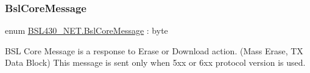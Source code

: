 \mbox{\label{namespace_b_s_l430___n_e_t_ac916153c12b33a95ee1fd35e1a15f17a}} 
\subsubsection{\texorpdfstring{BslCoreMessage}{BslCoreMessage}}
{\footnotesize\ttfamily enum \mbox{\hyperlink{namespace_b_s_l430___n_e_t_ac916153c12b33a95ee1fd35e1a15f17a}{B\+S\+L430\+\_\+\+N\+E\+T.\+Bsl\+Core\+Message}} \+: byte\hspace{0.3cm}{\ttfamily [strong]}}



B\+SL Core Message is a response to Erase or Download action. (Mass Erase, TX Data Block) This message is sent only when 5xx or 6xx protocol version is used. 

